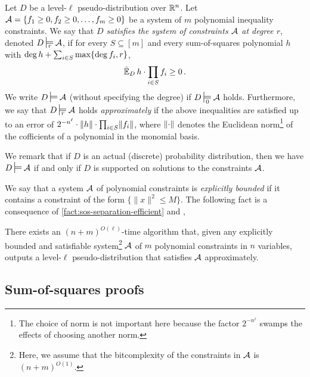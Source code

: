 \begin{definition}
  Let $D$ be a level-$\ell$ pseudo-distribution over $\mathbb R^n$.
  Let $\mathcal A = \{f_1\ge 0, f_2\ge 0, \ldots, f_m\ge 0\}$ be a system of $m$ polynomial inequality constraints.
  We say that \emph{$D$ satisfies the system of constraints $\mathcal A$ at degree $r$}, denoted $D \sdtstile{r}{} \cA$, if for every $S\subseteq[m]$ and every sum-of-squares polynomial $h$ with $\deg h + \sum_{i\in S} \max\{\deg f_i,r\}$,
  \begin{displaymath}
    \operatorname{\tilde{\mathbb{E}}}_{D} h \cdot \prod _{i\in S}f_i  \ge 0\,.
  \end{displaymath}
  We write $D \sdtstile{}{} \cA$ (without specifying the degree) if $D \sdtstile{0}{} \cA$ holds.
  Furthermore, we say that $D\sdtstile{r}{}\cA$ holds \emph{approximately} if the above inequalities are satisfied up to an error of $2^{-n^\ell}\cdot \lVert h\rVert\cdot\prod_{i\in S}\lVert f_i\rVert$, where $\lVert\cdot\rVert$ denotes the Euclidean norm\footnote{The choice of norm is not important here because the factor $2^{-n^\ell}$ swamps the effects of choosing another norm.} of the cofficients of a polynomial in the monomial basis.
\end{definition}

We remark that if $D$ is an actual (discrete) probability distribution, then we have  $D\sdtstile{}{}\cA$ if and only if $D$ is supported on solutions to the constraints $\mathcal A$.

We say that a system $\mathcal A$ of polynomial constraints is \emph{explicitly bounded} if it contains a constraint of the form $\{ \|x\|^2 \leq M\}$.
The following fact is a consequence of \cref{fact:sos-separation-efficient} and \cite{MR625550-Grotschel81},

\begin{fact}
There exists an $(n+ m)^{O(\ell)} $-time algorithm that, given any explicitly bounded and satisfiable system\footnote{Here, we assume that the bitcomplexity of the constraints in $\mathcal A$ is $(n+m)^{O(1)}$.} $\mathcal A$ of $m$ polynomial constraints in $n$ variables, outputs a level-$\ell$ pseudo-distribution that satisfies $\mathcal A$ approximately. \label{fact:eff-pseudo-distribution}
\end{fact}

\subsection{Sum-of-squares proofs}

